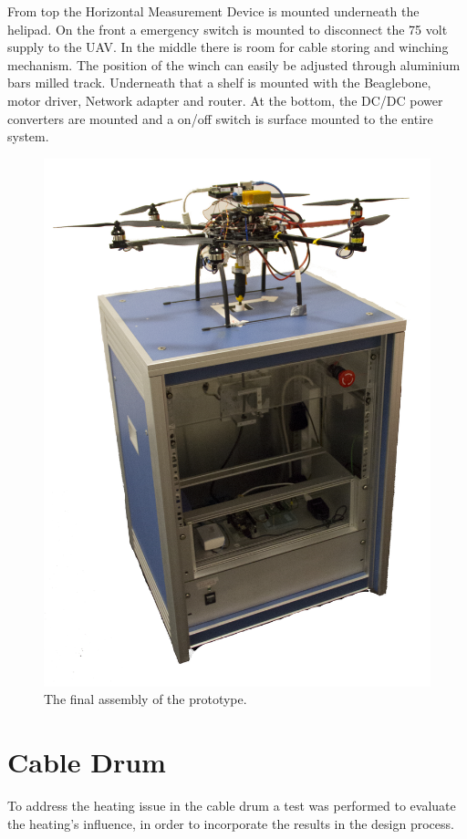 \noindent
From top the Horizontal Measurement Device is mounted underneath the helipad. On the front a emergency switch is mounted to disconnect the 75 volt supply to the UAV. In the middle there is room for cable storing and winching mechanism. The position of the winch can easily be adjusted through aluminium bars milled track.
Underneath that a shelf is mounted with the Beaglebone, motor driver, Network adapter and router.
At the bottom, the DC/DC power converters are mounted and a on/off switch is surface mounted to the entire system.  
\begin{figure}[hbtp]
\centering
\includegraphics[scale=0.5]{graphics/product_pictures/IMG_6249_cutout.jpg}
\caption{The final assembly of the prototype.}
\end{figure}


\newpage
\section{Cable Drum}
To address the heating issue in the cable drum a test was performed to evaluate the heating’s influence, in order to incorporate the results in the design process.\\

